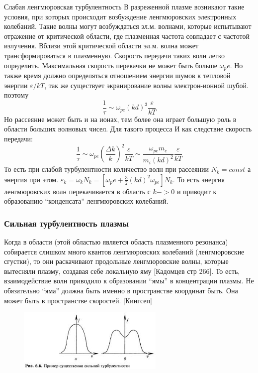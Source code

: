 \documentclass[10pt, a4paper]{article}
\begin{document}
Слабая ленгмюровская турбулентность
В разреженной плазме возникают такие условия, при которых происходит возбуждение ленгмюровских электронных колебаний. Такие волны могут возбуждаться эл.м. волнами, которые испытывают отражение от критической области, где плазменная частота совпадает с частотой излучения. Вблизи этой критической области эл.м. волна может трансформироваться в плазменную. Скорость передачи таких волн легко определить.
Максимальная скорость перекачки не может быть больше $\omega_pe$. Но также время должно определяться отношением энергии шумов к тепловой энергии $\varepsilon/kT$, так же существует экранирование волны электрон-ионной шубой. поэтому
\begin{equation}
\frac{1}{\tau} \sim \omega_{pe} (kd)^3 \frac{\varepsilon}{kT}
\end{equation}
Но рассеяние может быть и на ионах, тем более она играет большую роль в области больших волновых чисел. Для такого процесса
И как следствие скорость передачи:
\begin{equation}
\frac{1}{\tau} \sim \omega_{pe} (\frac{\Delta k}{k})^2 \frac{\varepsilon}{kT} \sim  \frac{\omega_{pe} m_e}{m_i (kd)^2}  \frac{\varepsilon}{kT}
\end{equation}
То есть при слабой турбулентности количество волн при рассеянии $N_k =const$ а энергия при этом. $\varepsilon_k = \omega_k N_k = [\omega_pe + \frac{3}{2} (kd)^2 \omega_{pe}]N_k$. То есть энергия ленгмюровских волн перекачивается в область с $k->0$ и приводит к образованию “конденсата” ленгмюровских колебаний.
\subsubsection{Сильная турбулентность плазмы}
Когда в области (этой областью является область плазменного резонанса) собирается слишком много квантов ленгмюровских колебаний (ленгмюровские сгустки), то они раскачивают продольные ленгмюровские волны, которые вытесняли плазму, создавая себе локальную яму [Кадомцев стр 266]. То есть, взаимодействие волн приводило к образовании “ямы” в концентрации плазмы.
Не обязательно “яма” должна быть именно в пространстве координат быть. Она может быть в пространстве скоростей. [Кингсеп]
\begin{figure}[ht]
	\begin{center}
		\includegraphics[width=70mm]{Turb_silnaya.JPG}
	\end{center}
\end{figure}
\end{document}
